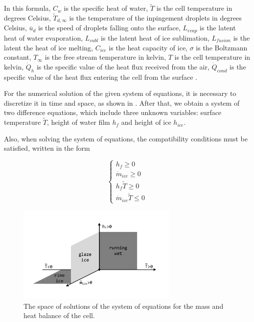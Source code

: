 \documentclass[
11pt,%
tightenlines,%
twoside,%
onecolumn,%
nofloats,%
nobibnotes,%
nofootinbib,%
superscriptaddress,%
noshowpacs,%
centertags]%
{revtex4}
\begin{document}
In this formula, $C_w$ is the specific heat of water, $\tilde{T}$ is the cell temperature in degrees Celsius, $\tilde{T}_{d,\infty}$ is the temperature of the inpingement droplets in degrees Celsius, $\overline{u}_d$ is the speed of droplets falling onto the surface, $L_{evap}$ is the latent heat of water evaporation, $L_{subl}$ is the latent heat of ice sublimation, $L_{fusion}$ is the latent the heat of ice melting, $C_{ice}$ is the heat capacity of ice, $\sigma$ is the Boltzmann constant, $T_{\infty}$ is the free stream temperature in kelvin, $T$ is the cell temperature in kelvin, $\dot Q_h$ is the specific value of the heat flux received from the air, $\dot Q_{cond}$ is the specific value of the heat flux entering the cell from the surface \cite{Dong}.

For the numerical solution of the given system of equations, it is necessary to discretize it in time and space, as shown in \cite{Beaugendre}.
After that, we obtain a system of two difference equations, which include three unknown variables: surface temperature $\tilde{T}$, height of water film $h_f$ and height of ice $h_{ice}$.

Also, when solving the system of equations, the compatibility conditions must be satisfied, written in the form

\begin{equation}
\begin{cases}
h_f \ge 0\\
\dot m_{ice} \ge 0\\
h_f \tilde{T} \ge 0\\
\dot m_{ice} \tilde{T} \le 0
\end{cases}
\end{equation}

\begin{figure}[h]
\setcaptionmargin{5mm}
\onelinecaptionstrue
\includegraphics[width=0.7\textwidth]{pics/surface.pdf}
\caption{The space of solutions of the system of equations for the mass and heat balance of the cell.}\label{fig:surface}
\end{figure}
\end{document}
